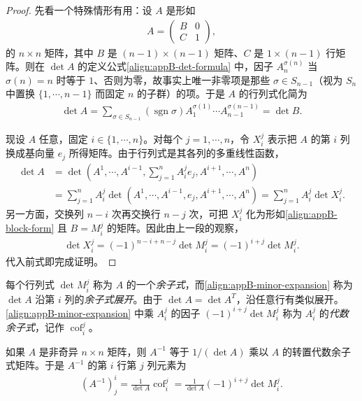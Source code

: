 \documentclass[../../main.tex]{subfiles}
\begin{document}
\begin{proof}
先看一个特殊情形有用：设 $A$ 是形如
\begin{align}\label{align:appB-block-form}
A=\begin{pmatrix}B&0\\ C&1\end{pmatrix},
\end{align}
的 $n\times n$ 矩阵，其中 $B$ 是 $(n-1)\times(n-1)$ 矩阵、$C$ 是 $1\times(n-1)$ 行矩阵。则在 $\det A$ 的定义公式\eqref{align:appB-det-formula} 中，因子 $A^{\sigma(n)}_n$ 当 $\sigma(n)=n$ 时等于 $1$、否则为零，故事实上唯一非零项是那些 $\sigma\in S_{n-1}$（视为 $S_n$ 中置换 $\{1,\cdots ,n-1\}$ 而固定 $n$ 的子群）的项。于是 $A$ 的行列式化简为
\begin{align*}
\det A=\sum_{\sigma\in S_{n-1}}(\operatorname{sgn}\sigma)A^{\sigma(1)}_1\cdots A^{\sigma(n-1)}_{n-1}=\det B.
\end{align*}

现设 $A$ 任意，固定 $i\in\{1,\cdots ,n\}$。对每个 $j=1,\cdots ,n$，令 $X^j_i$ 表示把 $A$ 的第 $i$ 列换成基向量 $e_j$ 所得矩阵。由于行列式是其各列的多重线性函数，
\begin{align*}
\det A&=\det\left(A^1,\cdots ,A^{i-1},\sum_{j=1}^n A^j_i e_j,A^{i+1},\cdots ,A^n\right)\\
&=\sum_{j=1}^n A^j_i\det(A^1,\cdots ,A^{i-1},e_j,A^{i+1},\cdots ,A^n)
=\sum_{j=1}^n A^j_i\det X^j_i.
\end{align*}
另一方面，交换列 $n-i$ 次再交换行 $n-j$ 次，可把 $X^j_i$ 化为形如\eqref{align:appB-block-form} 且 $B=M^j_i$ 的矩阵。因此由上一段的观察，
\begin{align*}
\det X^j_i=(-1)^{n-i+n-j}\det M^j_i=(-1)^{i+j}\det M^j_i.
\end{align*}
代入前式即完成证明。
\end{proof}

每个行列式 $\det M^j_i$ 称为 $A$ 的一个\emph{余子式}，而\eqref{align:appB-minor-expansion} 称为 $\det A$ 沿第 $i$ 列的\emph{余子式展开}。由于 $\det A=\det A^T$，沿任意行有类似展开。\eqref{align:appB-minor-expansion} 中乘 $A^j_i$ 的因子 $(-1)^{i+j}\det M^j_i$ 称为 $A^j_i$ 的\emph{代数余子式}，记作 $\operatorname{cof}^j_i$。

\begin{proposition}[Cramer 法则]\label{proposition:appB-cramer}
如果 $A$ 是非奇异 $n\times n$ 矩阵，则 $A^{-1}$ 等于 $1/(\det A)$ 乘以 $A$ 的转置代数余子式矩阵。于是 $A^{-1}$ 的第 $i$ 行第 $j$ 列元素为
\begin{align}\label{align:appB-cramer}
(A^{-1})^i_j=\frac{1}{\det A}\operatorname{cof}^j_i=\frac{1}{\det A}(-1)^{i+j}\det M^j_i.
\end{align}
\end{proposition}
\end{document}
